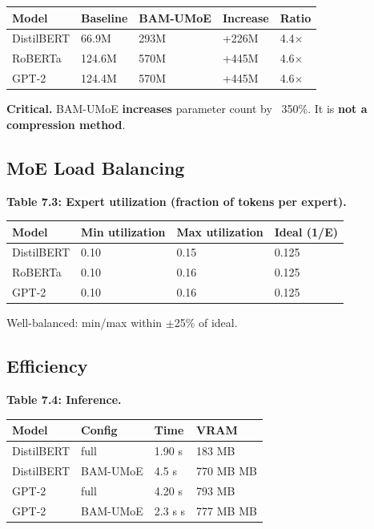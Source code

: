 \begin{table}[H]
\centering
\small
\begin{tabular}{lllll}
\toprule
\textbf{Model} & \textbf{Baseline} & \textbf{BAM-UMoE} & \textbf{Increase} & \textbf{Ratio} \\
\midrule
DistilBERT & 66.9M & 293M & +226M & 4.4$\times$ \\
RoBERTa & 124.6M & 570M & +445M & 4.6$\times$ \\
GPT-2 & 124.4M & 570M & +445M & 4.6$\times$ \\
\bottomrule
\end{tabular}
\end{table}

\textbf{Critical.} BAM-UMoE \textbf{increases} parameter count by ~350\%. 
It is \textbf{not a compression method}.

\subsection{MoE Load Balancing}

\textbf{Table 7.3: Expert utilization (fraction of tokens per expert).}

\begin{table}[H]
\centering
\small
\begin{tabular}{llll}
\toprule
\textbf{Model} & \textbf{Min utilization} & \textbf{Max utilization} & \textbf{Ideal (1/E)} \\
\midrule
DistilBERT & 0.10 & 0.15 & 0.125 \\
RoBERTa & 0.10 & 0.16 & 0.125 \\
GPT-2 & 0.10 & 0.16 & 0.125 \\
\bottomrule
\end{tabular}
\end{table}

Well-balanced: min/max within $\pm$25\% of ideal.

\subsection{Efficiency}

\textbf{Table 7.4: Inference.}

\begin{table}[H]
\centering
\small
\begin{tabular}{llll}
\toprule
\textbf{Model} & \textbf{Config} & \textbf{Time} & \textbf{VRAM} \\
\midrule
DistilBERT & full & 1.90 s & 183 MB \\
DistilBERT & BAM-UMoE & 4.5 s & 770 MB MB \\
GPT-2 & full & 4.20 s & 793 MB \\
GPT-2 & BAM-UMoE & 2.3 s s & 777 MB MB \\
\bottomrule
\end{tabular}
\end{table}

